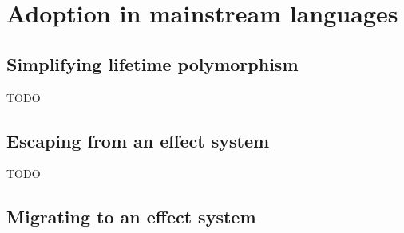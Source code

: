 \documentclass[acmsmall]{acmart}
\begin{document}
%










\section{Adoption in mainstream languages} \label{sec:mainstream}


\subsection{Simplifying lifetime polymorphism} \label{subsec:lifetime-elision}


TODO %

\subsection{Escaping from an effect system}




TODO %

\subsection{Migrating to an effect system}
\end{document}
